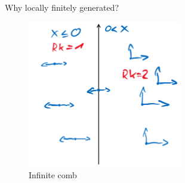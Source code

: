 \documentclass[hyperref={pdfpagelabels=false}]{beamer}
\theoremstyle{plain}
\theoremstyle{remark}
\begin{document}
{

\begin{frame}{Why locally finitely generated?}
\begin{figure}[htbp]
	\centering
		\includegraphics[width=0.6\textwidth]{Infinite comb.png}
	\caption{Infinite comb}
	\label{fig:Infinite comb}
\end{figure}

\end{frame}

}

%
\end{document}
